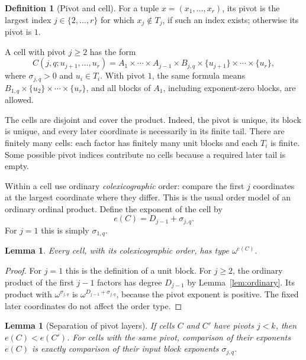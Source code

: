 \documentclass[11pt,letterpaper]{article}
\newtheorem{lemma}[theorem]{Lemma}
\theoremstyle{definition}
\newtheorem{definition}[theorem]{Definition}
\theoremstyle{remark}
\begin{document}
\begin{definition}[Pivot and cell]\label{def:pivot}
For a tuple $x=(x_1,\ldots,x_r)$, its pivot is the largest index
$j\in\{2,\ldots,r\}$ for which $x_j\notin T_j$, if such an index exists;
otherwise its pivot is $1$.

A cell with pivot $j\geq2$ has the form
\begin{equation}\label{eq:cell}
 C(j,q;u_{j+1},\ldots,u_r)
 =A_1\times\cdots\times A_{j-1}\times B_{j,q}
      \times\{u_{j+1}\}\times\cdots\times\{u_r\},
\end{equation}
where $\sigma_{j,q}>0$ and $u_i\in T_i$. With pivot $1$, the same formula
means $B_{1,q}\times\{u_2\}\times\cdots\times\{u_r\}$, and all blocks
of $A_1$, including exponent-zero blocks, are allowed.
\end{definition}

The cells are disjoint and cover the product. Indeed, the pivot is unique,
its block is unique, and every later coordinate is necessarily in its
finite tail. There are finitely many cells: each factor has finitely many
unit blocks and each $T_i$ is finite. Some possible pivot indices contribute
no cells because a required later tail is empty.

Within a cell use ordinary \emph{colexicographic} order: compare the first
$j$ coordinates at the largest coordinate where they differ. This is the
usual order model of an ordinary ordinal product. Define the exponent of
the cell by
\begin{equation}\label{eq:cell-exponent}
 e(C)=D_{j-1}+\sigma_{j,q}.
\end{equation}
For $j=1$ this is simply $\sigma_{1,q}$.

\begin{lemma}\label{lem:cell-type}
Every cell, with its colexicographic order, has type $\omega^{e(C)}$.
\end{lemma}

\begin{proof}
For $j=1$ this is the definition of a unit block. For $j\geq2$, the ordinary
product of the first $j-1$ factors has degree $D_{j-1}$ by
Lemma~\ref{lem:ordinary}. Its product with $\omega^{\sigma_{j,q}}$ is
$\omega^{D_{j-1}+\sigma_{j,q}}$, because the pivot exponent is positive.
The fixed later coordinates do not affect the order type.
\end{proof}

\begin{lemma}[Separation of pivot layers]\label{lem:pivot-separation}
If cells $C$ and $C'$ have pivots $j<k$, then $e(C)<e(C')$.
For cells with the same pivot, comparison of their exponents $e(C)$ is
exactly comparison of their input block exponents $\sigma_{j,q}$.
\end{lemma}
\end{document}
